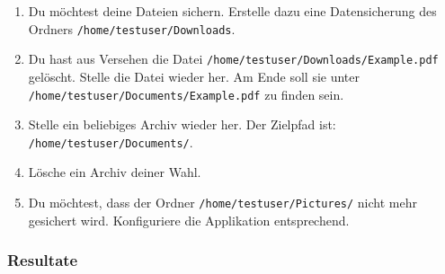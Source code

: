 \begin{enumerate}
\item Du möchtest deine Dateien sichern. Erstelle dazu eine Datensicherung des Ordners \texttt{/home/testuser/Downloads}.
\item Du hast aus Versehen die Datei
  \texttt{/home/testuser/Downloads/Example.pdf} gelöscht. Stelle die Datei
  wieder her.\newline
  Am Ende soll sie unter \texttt{/home/testuser/Documents/Example.pdf} zu finden sein.
\item Stelle ein beliebiges Archiv wieder her.\newline
  Der Zielpfad ist: \texttt{/home/testuser/Documents/}.
\item Lösche ein Archiv deiner Wahl.
\item Du möchtest, dass der Ordner \texttt{/home/testuser/Pictures/} nicht mehr gesichert
wird. Konfiguriere die Applikation entsprechend.
\end{enumerate}

\newpage
\subsubsection{Resultate}
\label{sec:org18050af}

